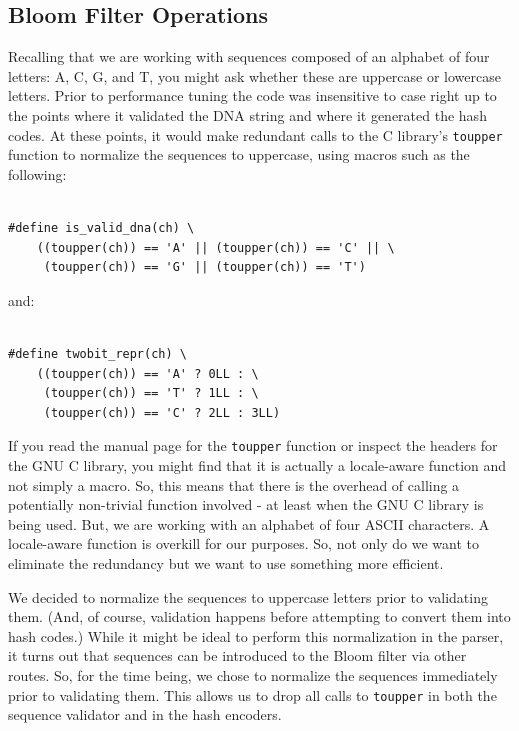 \documentclass{article}
\begin{document}
\subsection{Bloom Filter Operations}

Recalling that we are working with sequences composed of an alphabet of four letters: A, C, G, and T, you might ask whether these are uppercase or lowercase letters. Prior to performance tuning the code was insensitive to case right up to the points where it validated the DNA string and where it generated the hash codes. At these points, it would make redundant calls to the C library's \texttt{toupper} function to normalize the sequences to uppercase, using macros such as the following:

\begin{verbatim}

#define is_valid_dna(ch) \
    ((toupper(ch)) == 'A' || (toupper(ch)) == 'C' || \
     (toupper(ch)) == 'G' || (toupper(ch)) == 'T')

\end{verbatim}

and:

\begin{verbatim}

#define twobit_repr(ch) \
    ((toupper(ch)) == 'A' ? 0LL : \
     (toupper(ch)) == 'T' ? 1LL : \
     (toupper(ch)) == 'C' ? 2LL : 3LL)

\end{verbatim}

If you read the manual page for the \texttt{toupper} function or inspect the headers for the GNU C library, you might find that it is actually a locale-aware function and not simply a macro. So, this means that there is the overhead of calling a potentially non-trivial function involved - at least when the GNU C library is being used. But, we are working with an alphabet of four ASCII characters. A locale-aware function is overkill for our purposes. So, not only do we want to eliminate the redundancy but we want to use something more efficient.

We decided to normalize the sequences to uppercase letters prior to validating them. (And, of course, validation happens before attempting to convert them into hash codes.) While it might be ideal to perform this normalization in the parser, it turns out that sequences can be introduced to the Bloom filter via other routes. So, for the time being, we chose to normalize the sequences immediately prior to validating them. This allows us to drop all calls to \texttt{toupper} in both the sequence validator and in the hash encoders.
\end{document}
